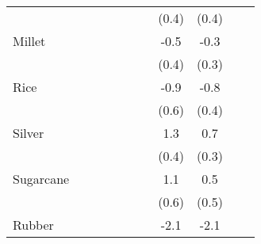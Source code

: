 {\begin{tabular}{l*{10}{c}}
                    &                     &                     &                     &                     &                     &                     &       (0.4)         &       (0.4)         &                     &                     \\
Millet              &                     &                     &                     &                     &                     &                     &        -0.5         &        -0.3         &                     &                     \\
                    &                     &                     &                     &                     &                     &                     &       (0.4)         &       (0.3)         &                     &                     \\
Rice                &                     &                     &                     &                     &                     &                     &        -0.9         &        -0.8         &                     &                     \\
                    &                     &                     &                     &                     &                     &                     &       (0.6)         &       (0.4)         &                     &                     \\
Silver              &                     &                     &                     &                     &                     &                     &         1.3\sym{**} &         0.7\sym{*}  &                     &                     \\
                    &                     &                     &                     &                     &                     &                     &       (0.4)         &       (0.3)         &                     &                     \\
Sugarcane           &                     &                     &                     &                     &                     &                     &         1.1         &         0.5         &                     &                     \\
                    &                     &                     &                     &                     &                     &                     &       (0.6)         &       (0.5)         &                     &                     \\
Rubber              &                     &                     &                     &                     &                     &                     &        -2.1\sym{***}&        -2.1\sym{***}&                     &                     \\

\end{tabular}}
